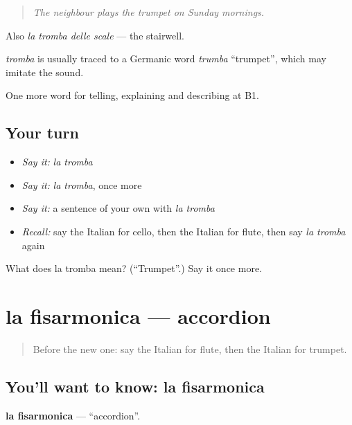 \begin{quote}
\emph{The neighbour plays the trumpet on Sunday mornings.}
\end{quote}

Also \emph{la tromba delle scale} — the stairwell.

\begin{cousinweb}
\emph{tromba} is usually traced to a Germanic word \emph{trumba} \textquotedblleft{}trumpet\textquotedblright{}, which may imitate the sound.
\end{cousinweb}

\begin{grammarlens}[title={What you've built}]
One more word for telling, explaining and describing at B1.
\end{grammarlens}

\subsection*{Your turn}
\begin{itemize}
\raggedright
  \item \emph{Say it:} \emph{la tromba}
  \item \emph{Say it:} \emph{la tromba}, once more
  \item \emph{Say it:} a sentence of your own with \emph{la tromba}
  \item \emph{Recall:} say the Italian for cello, then the Italian for flute, then say \emph{la tromba} again
\end{itemize}

\begin{tcolorbox}[breakable,colback=teal!4,colframe=teal!35!black,title={Before you move on}]
What does la tromba mean? (\textquotedblleft{}Trumpet\textquotedblright{}.) Say it once more.
\end{tcolorbox}
\section[la fisarmonica]{la fisarmonica — accordion}

\label{lesson:IT-C516-fisarmonica}



\begin{quote}
Before the new one: say the Italian for flute, then the Italian for trumpet.
\end{quote}

\subsection*{You'll want to know: la fisarmonica}
\textbf{la fisarmonica} — \textquotedblleft{}accordion\textquotedblright{}.

